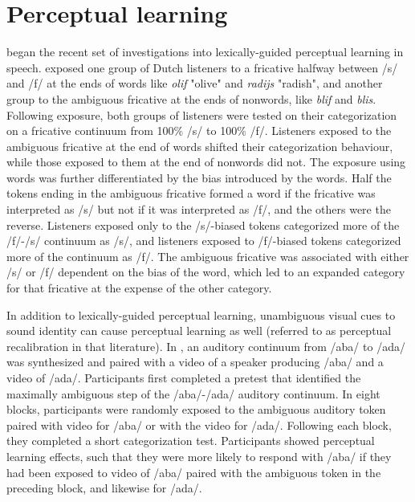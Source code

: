 \section{Perceptual learning}
\label{sec:perceptuallearning}


\citet{Norris2003} began the recent set of investigations into lexically-guided perceptual learning in speech.
\citet{Norris2003} exposed one group of Dutch listeners to a fricative halfway between /s/ and /f/ at the ends of words like \emph{olif} "olive" and \emph{radijs} "radish", and another group to the ambiguous fricative at the ends of nonwords, like \emph{blif} and \emph{blis}.
Following exposure, both groups of listeners were tested on their categorization on a fricative continuum from 100\% /s/ to 100\% /f/. 
Listeners exposed to the ambiguous fricative at the end of words shifted their categorization behaviour, while those exposed to them at the end of nonwords did not.  The exposure using words was further differentiated by the bias introduced by the words.  
Half the tokens ending in the ambiguous fricative formed a word if the fricative was interpreted as /s/ but not if it was interpreted as /f/, and the others were the reverse.  
Listeners exposed only to the /s/-biased tokens categorized more of the /f/-/s/ continuum as /s/, and listeners exposed to /f/-biased tokens categorized more of the continuum as /f/.  
The ambiguous fricative was associated with either /s/ or /f/ dependent on the bias of the word, which led to an expanded category for that fricative at the expense of the other category.

In addition to lexically-guided perceptual learning, unambiguous visual cues to sound identity can cause perceptual learning as well (referred to as perceptual recalibration in that literature).
In \citet{Bertelson2003}, an auditory continuum from /aba/ to /ada/ was synthesized and paired with a video of a speaker producing /aba/ and a video of /ada/.  
Participants first completed a pretest that identified the maximally ambiguous step of the /aba/-/ada/ auditory continuum. 
 In eight blocks, participants were randomly exposed to the ambiguous auditory token paired with video for /aba/ or with the video for /ada/.  Following each block, they completed a short categorization test.  
Participants showed perceptual learning effects, such that they were more likely to respond with /aba/ if they had been exposed to video of /aba/ paired with the ambiguous token in the preceding block, and likewise for /ada/.

